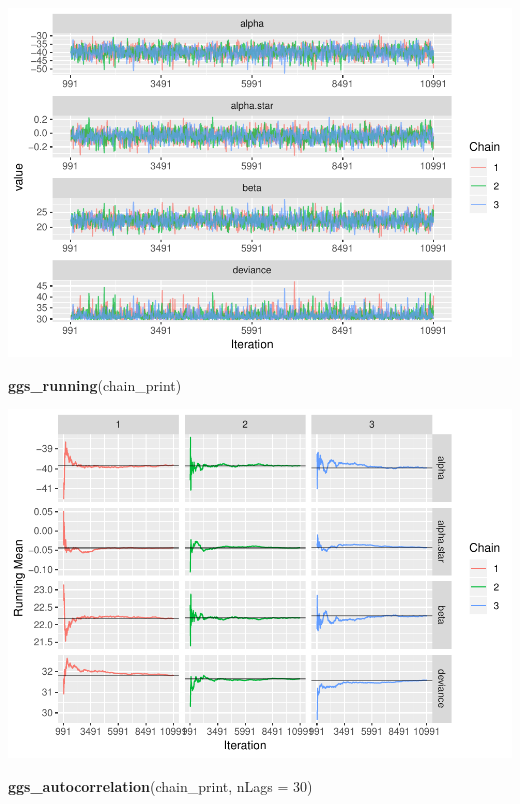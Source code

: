 \documentclass[]{article}
\newenvironment{Shaded}{\begin{snugshade}}{\end{snugshade}}
\newcommand{\DataTypeTok}[1]{\textcolor[rgb]{0.13,0.29,0.53}{#1}}
\newcommand{\DecValTok}[1]{\textcolor[rgb]{0.00,0.00,0.81}{#1}}
\newcommand{\KeywordTok}[1]{\textcolor[rgb]{0.13,0.29,0.53}{\textbf{#1}}}
\newcommand{\NormalTok}[1]{#1}
\begin{document}
\includegraphics{FinalProject-SDSII_files/figure-latex/unnamed-chunk-25-1.pdf}

\begin{Shaded}
\begin{Highlighting}[]
\KeywordTok{ggs_running}\NormalTok{(chain_print)}
\end{Highlighting}
\end{Shaded}

\includegraphics{FinalProject-SDSII_files/figure-latex/unnamed-chunk-25-2.pdf}

\begin{Shaded}
\begin{Highlighting}[]
\KeywordTok{ggs_autocorrelation}\NormalTok{(chain_print, }\DataTypeTok{nLags =} \DecValTok{30}\NormalTok{)}
\end{Highlighting}
\end{Shaded}
\end{document}
